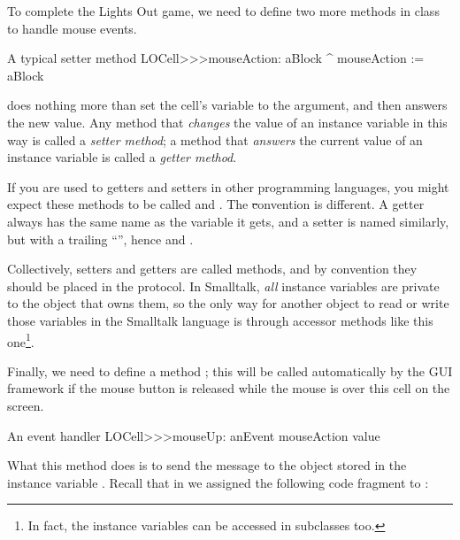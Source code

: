 \documentclass[a4paper,10pt,twoside]{book}
\begin{document}
{To complete the Lights Out game, we need to define two more methods in class  to handle mouse events.
\begin{method}[mouseAction:]{A typical setter method}
LOCell>>>mouseAction: aBlock
   ^ mouseAction := aBlock
\end{method}

 does nothing more than set the cell's  variable to the argument, and then answers the new value.
Any method that \emph{changes} the value of an instance variable in this way is called a \emph{setter method}; a method that \emph{answers} the current value of an instance variable is called a \emph{getter method}.

If you are used to getters and setters in other programming languages, you might expect these methods to be called  and .
The \st convention is different.
A getter always has the same name as the variable it gets, and a setter is named similarly, but with a trailing ``\ct{:}'', hence  and .

Collectively, setters and getters are called   methods, and by convention they should be placed in the  protocol.
In Smalltalk, \emph{all} instance variables are private to the object that owns them, so the only way for another object to read or write those variables in the Smalltalk language is through accessor methods like this one\footnote{In fact, the instance variables can be accessed in subclasses too.}.


Finally, we need to define a method ; this will be called automatically by the GUI framework if the mouse button is released while the mouse is over this cell on the screen.

\begin{method}[sbecellmouseup]{An event handler}
LOCell>>>mouseUp: anEvent
   mouseAction value
\end{method}


What this method does is to send the message  to the object stored in the instance variable . 
Recall that in  we assigned the following code fragment to :

}
\end{document}
